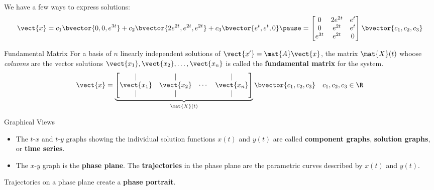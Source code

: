 \documentclass{beamer}
\begin{document}
\begin{frame}
\begin{block}{}
We have a few ways to express solutions:
\begin{equation*}
\vect{x}=
c_1\bvector{0,0,e^{3t}}+
c_2\bvector{2e^{2t},e^{2t},e^{2t}}+
c_3\bvector{e^t,e^t,0}\pause
=
\begin{bmatrix}
0 & 2e^{2t} & e^t \\
0 & e^{2t} & e^t \\
e^{3t} & e^{2t} & 0 \\
\end{bmatrix}
\bvector{c_1,c_2,c_3}
\end{equation*}
\end{block}\pause
\begin{block}{Fundamental Matrix}
For a basis of $n$ linearly independent solutions of $\vect{x^\prime}=\mat{A}\vect{x}$, the matrix $\mat{X}(t)$ whoose \emph{columns} are the vector solutions $\vect{x_1},\vect{x_2},\ldots,\vect{x_n}$ is called the \textbf{fundamental matrix} for the system.
\begin{equation*}
\vect{x}=
\underbrace{\begin{bmatrix}
\mid & \mid & & \mid \\
\vect{x_1} & \vect{x_2} & \cdots & \vect {x_n} \\
\mid & \mid & & \mid \\
\end{bmatrix}}_{\mat{X}(t)}
\bvector{c_1,c_2,c_3}
\quad c_1,c_2,c_3\in\R
\end{equation*}
\end{block}
\end{frame}

\begin{frame}
\begin{block}{Graphical Views}
\begin{itemize}
\item The $t$-$x$ and $t$-$y$ graphs showing the individual solution functions $x(t)$ and $y(t)$ are called \textbf{component graphs}, \textbf{solution graphs}, or \textbf{time series}.
\item The $x$-$y$ graph is the \textbf{phase plane}. The \textbf{trajectories} in the phase plane are the parametric curves described by $x(t)$ and $y(t)$.
\end{itemize}
Trajectories on a phase plane create a \textbf{phase portrait}.
\end{block}
\end{frame}
\end{document}
